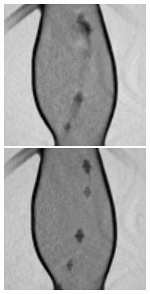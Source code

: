 \documentclass[conference]{IEEEtran}
\begin{document}
\begin{figure}[h]
    \centering
    \begin{minipage}{0.241\textwidth}
        \centering
        \includegraphics[width=\textwidth]{Conference/img/flow-artifact-with.jpg}
    \end{minipage}\hfill \hspace*{0cm}
    \begin{minipage}{0.241\textwidth}
        \centering
        \includegraphics[width=\textwidth]{Conference/img/flow-artifact-without.jpg}

\end{minipage}
\end{figure}
\end{document}
